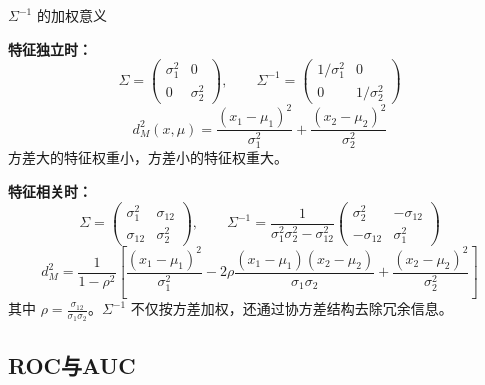 \begin{note}{$\Sigma^{-1}$ 的加权意义}

\textbf{特征独立时：}
\[
\Sigma = \begin{pmatrix}\sigma_1^2 & 0\\0 & \sigma_2^2\end{pmatrix},\qquad
\Sigma^{-1} = \begin{pmatrix}1/\sigma_1^2 & 0\\0 & 1/\sigma_2^2\end{pmatrix}
\]
\[
d_M^2(x,\mu) = \frac{(x_1-\mu_1)^2}{\sigma_1^2} + \frac{(x_2-\mu_2)^2}{\sigma_2^2}
\]
方差大的特征权重小，方差小的特征权重大。

\textbf{特征相关时：}
\[
\Sigma = \begin{pmatrix}\sigma_1^2 & \sigma_{12}\\\sigma_{12} & \sigma_2^2\end{pmatrix},\qquad
\Sigma^{-1} = \frac{1}{\sigma_1^2\sigma_2^2 - \sigma_{12}^2}
\begin{pmatrix}\sigma_2^2 & -\sigma_{12}\\-\sigma_{12} & \sigma_1^2\end{pmatrix}
\]
\[
d_M^2 = \frac{1}{1-\rho^2}\left[
\frac{(x_1-\mu_1)^2}{\sigma_1^2} - 2\rho\frac{(x_1-\mu_1)(x_2-\mu_2)}{\sigma_1\sigma_2} + \frac{(x_2-\mu_2)^2}{\sigma_2^2}
\right]
\]
其中 $\rho = \frac{\sigma_{12}}{\sigma_1\sigma_2}$。$\Sigma^{-1}$ 不仅按方差加权，还通过协方差结构去除冗余信息。
\end{note}


\subsection{ROC与AUC}


